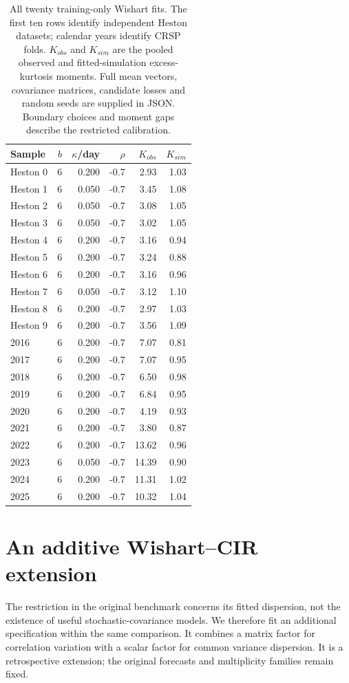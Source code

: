 \documentclass[11pt]{article}
\theoremstyle{definition}\newtheorem{definition}[theorem]{Definition}
\theoremstyle{remark}\newtheorem{remark}[theorem]{Remark}
\begin{document}
\begin{table}[htbp]
\centering\footnotesize
\setlength{\tabcolsep}{4pt}
\begin{tabular}{lrrrrr}
\toprule
Sample & $b$ & $\kappa$/day & $\rho$ & $K_{obs}$ & $K_{sim}$ \\
\midrule
Heston 0 & 6 & 0.200 & -0.7 & 2.93 & 1.03 \\
Heston 1 & 6 & 0.050 & -0.7 & 3.45 & 1.08 \\
Heston 2 & 6 & 0.050 & -0.7 & 3.08 & 1.05 \\
Heston 3 & 6 & 0.050 & -0.7 & 3.02 & 1.05 \\
Heston 4 & 6 & 0.200 & -0.7 & 3.16 & 0.94 \\
Heston 5 & 6 & 0.200 & -0.7 & 3.24 & 0.88 \\
Heston 6 & 6 & 0.200 & -0.7 & 3.16 & 0.96 \\
Heston 7 & 6 & 0.050 & -0.7 & 3.12 & 1.10 \\
Heston 8 & 6 & 0.200 & -0.7 & 2.97 & 1.03 \\
Heston 9 & 6 & 0.200 & -0.7 & 3.56 & 1.09 \\
2016 & 6 & 0.200 & -0.7 & 7.07 & 0.81 \\
2017 & 6 & 0.200 & -0.7 & 7.07 & 0.95 \\
2018 & 6 & 0.200 & -0.7 & 6.50 & 0.98 \\
2019 & 6 & 0.200 & -0.7 & 6.84 & 0.95 \\
2020 & 6 & 0.200 & -0.7 & 4.19 & 0.93 \\
2021 & 6 & 0.200 & -0.7 & 3.80 & 0.87 \\
2022 & 6 & 0.200 & -0.7 & 13.62 & 0.96 \\
2023 & 6 & 0.050 & -0.7 & 14.39 & 0.90 \\
2024 & 6 & 0.200 & -0.7 & 11.31 & 1.02 \\
2025 & 6 & 0.200 & -0.7 & 10.32 & 1.04 \\
\bottomrule
\end{tabular}
\caption{All twenty training-only Wishart fits. The first ten rows identify independent Heston datasets; calendar years identify CRSP folds. $K_{obs}$ and $K_{sim}$ are the pooled observed and fitted-simulation excess-kurtosis moments. Full mean vectors, covariance matrices, candidate losses and random seeds are supplied in JSON. Boundary choices and moment gaps describe the restricted calibration.}\label{tab:wishart-parameters}
\end{table}


\FloatBarrier
\section{An additive Wishart--CIR extension}\label{app:wishart-cir}
The restriction in the original benchmark concerns its fitted dispersion, not the existence of useful stochastic-covariance models. We therefore fit an additional specification within the same comparison. It combines a matrix factor for correlation variation with a scalar factor for common variance dispersion. It is a retrospective extension; the original forecasts and multiplicity families remain fixed.
\end{document}
